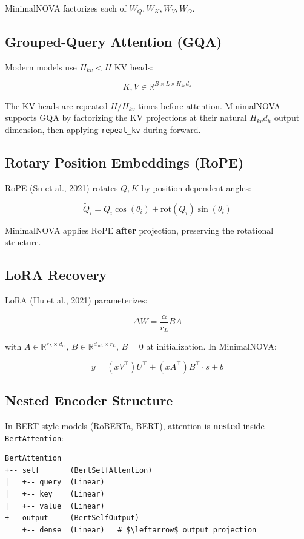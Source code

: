 MinimalNOVA factorizes each of $W_Q, W_K, W_V, W_O$.

\subsection{Grouped-Query Attention (GQA)}

Modern models use $H_{kv} < H$ KV heads:

\[
K, V \in \mathbb{R}^{B \times L \times H_{kv} d_h}
\tag{3.8}
\]

The KV heads are repeated $H/H_{kv}$ times before attention. MinimalNOVA 
supports GQA by factorizing the KV projections at their natural 
$H_{kv} d_h$ output dimension, then applying \texttt{repeat\_kv} during forward.

\subsection{Rotary Position Embeddings (RoPE)}

RoPE (Su et al., 2021) rotates $Q, K$ by position-dependent angles:

\[
\tilde{Q}_i = Q_i \cos(\theta_i) + \text{rot}(Q_i) \sin(\theta_i)
\tag{3.9}
\]

MinimalNOVA applies RoPE \textbf{after} projection, preserving the rotational 
structure.

\subsection{LoRA Recovery}

LoRA (Hu et al., 2021) parameterizes:

\[
\Delta W = \frac{\alpha}{r_L} B A
\tag{3.10}
\]

with $A \in \mathbb{R}^{r_L \times d_\text{in}}$, $B \in \mathbb{R}^{d_\text{out} \times r_L}$, 
$B = 0$ at initialization. In MinimalNOVA:

\[
y = (x V^\top) U^\top + (x A^\top) B^\top \cdot s + b
\tag{3.11}
\]

\subsection{Nested Encoder Structure}

In BERT-style models (RoBERTa, BERT), attention is \textbf{nested} inside 
\texttt{BertAttention}:

\begin{lstlisting}
BertAttention
+-- self       (BertSelfAttention)
|   +-- query  (Linear)
|   +-- key    (Linear)
|   +-- value  (Linear)
+-- output     (BertSelfOutput)
    +-- dense  (Linear)   # $\leftarrow$ output projection
\end{lstlisting}

